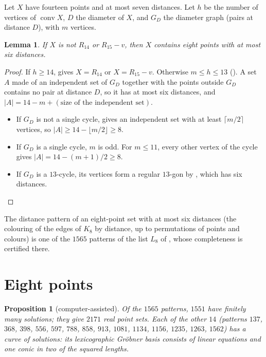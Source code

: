 \documentclass[11pt]{amsart}
\newtheorem{proposition}[theorem]{Proposition}
\newtheorem{lemma}[theorem]{Lemma}
\theoremstyle{remark}
\newcommand{\conv}{\operatorname{conv}}
\begin{document}
Let $X$ have fourteen points and at most seven distances. Let $h$ be the number of vertices of $\conv X$,
$D$ the diameter of $X$, and $G_D$ the diameter graph (pairs at distance $D$), with $m$ vertices.

\begin{lemma}\label{lem:eight}
If $X$ is not $R_{14}$ or $R_{15}-v$, then $X$ contains eight points with at most six distances.
\end{lemma}

\begin{proof}
If $h\ge14$, \cite[Lemma~10]{AC} gives $X=R_{14}$ or $X=R_{15}-v$. Otherwise $m\le h\le 13$
(\cite[Lemma~8(1)]{AC}). A set $A$ made of an independent set of $G_D$ together with the points outside
$G_D$ contains no pair at distance $D$, so it has at most six distances, and
$|A| = 14-m+(\text{size of the independent set})$.
\begin{itemize}
\item If $G_D$ is not a single cycle, \cite[Lemma~8(3)]{AC} gives an independent set with at least
  $\lceil m/2\rceil$ vertices, so $|A|\ge 14-\lfloor m/2\rfloor\ge 8$.
\item If $G_D$ is a single cycle, $m$ is odd. For $m\le11$, every other vertex of the cycle gives
  $|A| = 14-(m+1)/2\ge 8$.
\item If $G_D$ is a $13$-cycle, its vertices form a regular $13$-gon by \cite[Lemma~11]{AC}, which has six
  distances.\qedhere
\end{itemize}
\end{proof}

The distance pattern of an eight-point set with at most six distances (the colouring of the edges of $K_8$
by distance, up to permutations of points and colours) is one of the $1565$ patterns of the list $L_8$ of
\cite[Sections~2--3]{AC}, whose completeness is certified there.

\section{Eight points}

\begin{proposition}[computer-assisted]\label{prop:eight}
Of the $1565$ patterns, $1551$ have finitely many solutions; they give $2171$ real point sets. Each of the
other $14$ (patterns $137$, $368$, $398$, $556$, $597$, $788$, $858$, $913$, $1081$, $1134$, $1156$, $1235$,
$1263$, $1562$) has a curve of solutions: its lexicographic Gröbner basis consists of linear equations and
one conic in two of the squared lengths.
\end{proposition}
\end{document}
